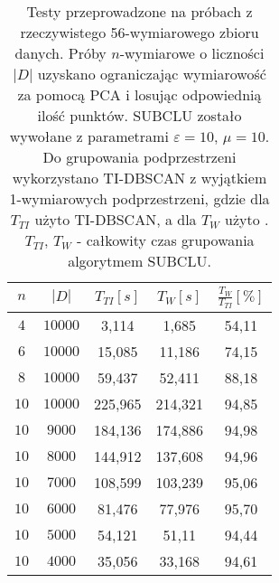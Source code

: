 \begin{table}
	\centering
	\begin{tabular}{c | c | c | c | c |}
		$ n $ & $ |D| $ & $ T_{TI} [s]$ & $ T_{W} [s]$ & $ \frac{T_{W}}{T_{TI}} [\%] $ \\ \hline
		$ 4 $  & $ 10000 $	& 3,114 	& 1,685    & 54,11 \\ \hline
		$ 6 $  & $ 10000 $	& 15,085 	& 11,186   & 74,15 \\ \hline
		$ 8 $  & $ 10000 $	& 59,437 	& 52,411 	 & 88,18 \\ \hline
		$ 10 $ & $ 10000 $  & 225,965 & 214,321  & 94,85 \\ \hline
		$ 10 $ & $ 9000 $ 	& 184,136 & 174,886  & 94,98 \\ \hline
		$ 10 $ & $ 8000 $ 	& 144,912 & 137,608  & 94,96 \\ \hline
		$ 10 $ & $ 7000 $ 	& 108,599 & 103,239  & 95,06 \\ \hline
		$ 10 $ & $ 6000 $ 	& 81,476 	& 77,976 	 & 95,70 \\ \hline
		$ 10 $ & $ 5000 $ 	& 54,121 	& 51,11 	 & 94,44 \\ \hline
		$ 10 $ & $ 4000 $ 	& 35,056 	& 33,168 	 & 94,61 \\ \hline




	\end{tabular}
	\caption{Testy przeprowadzone na próbach z rzeczywistego 56-wymiarowego zbioru danych. Próby $ n $-wymiarowe o liczności $ |D| $ uzyskano ograniczając wymiarowość za pomocą PCA i losując odpowiednią ilość punktów. SUBCLU zostało wywołane z parametrami $ \varepsilon=10 $, $ \mu=10 $. Do grupowania podprzestrzeni wykorzystano TI-DBSCAN z wyjątkiem 1-wymiarowych podprzestrzeni, gdzie dla $ T_{TI} $ użyto TI-DBSCAN, a dla $ T_{W} $ użyto . $ T_{TI},\,T_{W} $ - całkowity czas grupowania algorytmem SUBCLU.}\label{odc:real-test}
\end{table} 